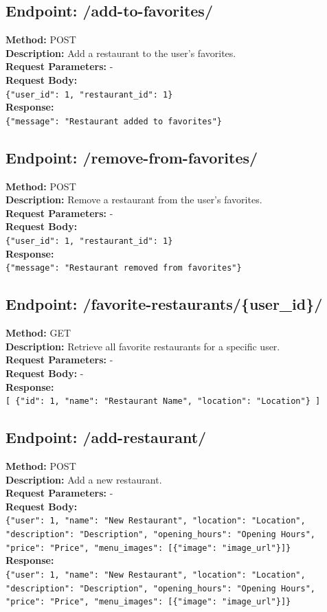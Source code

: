 \documentclass[12pt, a4paper, oneside]{article}
\begin{document}
\subsection*{Endpoint: /add-to-favorites/}
\textbf{Method:} POST \\
\textbf{Description:} Add a restaurant to the user's favorites. \\
\textbf{Request Parameters:} - \\
\textbf{Request Body:} \\
\texttt{\{"user\_id": 1, "restaurant\_id": 1\}} \\
\textbf{Response:} \\
\texttt{\{"message": "Restaurant added to favorites"\}}

\subsection*{Endpoint: /remove-from-favorites/}
\textbf{Method:} POST \\
\textbf{Description:} Remove a restaurant from the user's favorites. \\
\textbf{Request Parameters:} - \\
\textbf{Request Body:} \\
\texttt{\{"user\_id": 1, "restaurant\_id": 1\}} \\
\textbf{Response:} \\
\texttt{\{"message": "Restaurant removed from favorites"\}}

\subsection*{Endpoint: /favorite-restaurants/\{user_id\}/}
\textbf{Method:} GET \\
\textbf{Description:} Retrieve all favorite restaurants for a specific user. \\
\textbf{Request Parameters:} - \\
\textbf{Request Body:} - \\
\textbf{Response:} \\
\texttt{[ \{"id": 1, "name": "Restaurant Name", "location": "Location"\} ]}

\subsection*{Endpoint: /add-restaurant/}
\textbf{Method:} POST \\
\textbf{Description:} Add a new restaurant. \\
\textbf{Request Parameters:} - \\
\textbf{Request Body:} \\
\texttt{\{"user": 1, "name": "New Restaurant", "location": "Location", "description": "Description", "opening\_hours": "Opening Hours", "price": "Price", "menu\_images": [\{"image": "image\_url"\}]\}} \\
\textbf{Response:} \\
\texttt{\{"user": 1, "name": "New Restaurant", "location": "Location", "description": "Description", "opening\_hours": "Opening Hours", "price": "Price", "menu\_images": [\{"image": "image\_url"\}]\}}
\end{document}

